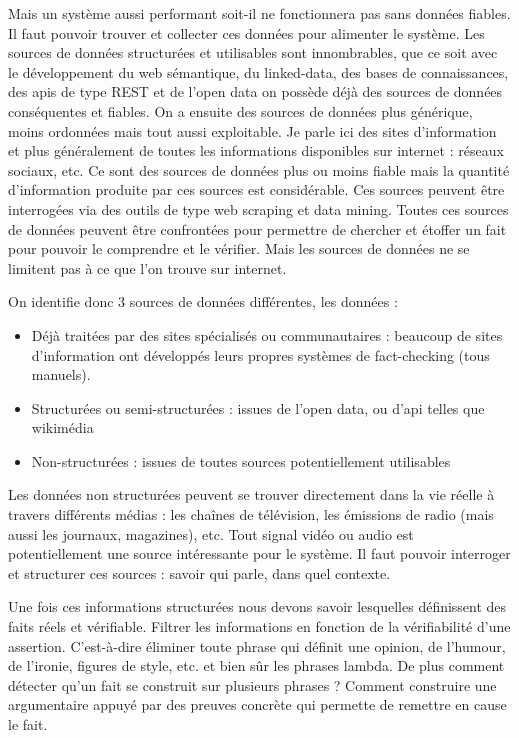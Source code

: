 Mais un système aussi performant soit-il ne fonctionnera pas sans données fiables. Il faut pouvoir trouver et collecter ces données pour alimenter le système. Les sources de données structurées et utilisables sont innombrables, que ce soit avec le développement du web sémantique, du linked-data, des bases de connaissances, des apis de type REST et de l'open data on possède déjà des sources de données conséquentes et fiables. On a ensuite des sources de données plus générique, moins ordonnées mais tout aussi exploitable. Je parle ici des sites d'information et plus généralement de toutes les informations disponibles sur internet : réseaux sociaux, etc. Ce sont des sources de données plus ou moins fiable mais la quantité d'information produite par ces sources est considérable. Ces sources peuvent être interrogées via des outils de type web scraping et data mining.
Toutes ces sources de données peuvent être confrontées pour permettre de chercher et étoffer un fait pour pouvoir le comprendre et le vérifier.
Mais les sources de données ne se limitent pas à ce que l'on trouve sur internet.

On identifie donc 3 sources de données différentes, les données : 

\begin{itemize}
    \item Déjà traitées par des sites spécialisés ou communautaires : beaucoup de sites d'information ont développés leurs propres systèmes de fact-checking (tous manuels). 
    \item Structurées ou semi-structurées : issues de l'open data, ou d'api telles que wikimédia
    \item Non-structurées : issues de toutes sources potentiellement utilisables
\end{itemize}

Les données non structurées peuvent se trouver directement dans la vie réelle à travers différents médias : les chaînes de télévision, les émissions de radio (mais aussi les journaux, magazines), etc. Tout signal vidéo ou audio est potentiellement une source intéressante pour le système. Il faut pouvoir interroger et structurer ces sources : savoir qui parle, dans quel contexte.

Une fois ces informations structurées nous devons savoir lesquelles définissent des faits réels et vérifiable. Filtrer les informations en fonction de la vérifiabilité d'une assertion. C'est-à-dire éliminer toute phrase qui définit une opinion, de l'humour, de l'ironie, figures de style, etc. et bien sûr les phrases lambda. De plus comment détecter qu'un fait se construit sur plusieurs phrases ? Comment construire une argumentaire appuyé par des preuves concrète qui permette de remettre en cause le fait.

